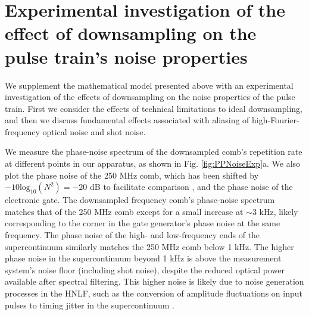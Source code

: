 \section{Experimental investigation of the effect of downsampling on the pulse train's noise properties}\label{sec:PPNoiseExp}
We supplement the mathematical model presented above with an experimental investigation of the effects of downsampling on the noise properties of the pulse train. First we consider the effects of technical limitations to ideal downsampling, and then we discuss fundamental effects associated with aliasing of high-Fourier-frequency optical noise and shot noise. 

We measure the phase-noise spectrum of the downsampled comb's repetition rate at different points in our apparatus, as shown in Fig. \ref{fig:PPNoiseExp}a. We also plot the phase noise of the 250 MHz comb, which has been shifted by $-10 \mathrm{log}_{10}(N^2)=-20$ dB to facilitate comparison \cite{Mandridis2010}, and the phase noise of the electronic gate. The downsampled frequency comb's phase-noise spectrum matches that of the 250 MHz comb except for a small increase at $\sim$3 kHz, likely corresponding to the corner in the gate generator's phase noise at the same frequency. The phase noise of the high- and low-frequency ends of the supercontinuum similarly matches the 250 MHz comb below 1 kHz.  The higher phase noise in the supercontinuum beyond 1 kHz is above the measurement system's noise floor (including shot noise), despite the reduced optical power available after spectral filtering. This higher noise is likely due to noise generation processes in the HNLF, such as the conversion of amplitude fluctuations on input pulses to timing jitter in the supercontinuum \cite{Dudley2006}.

